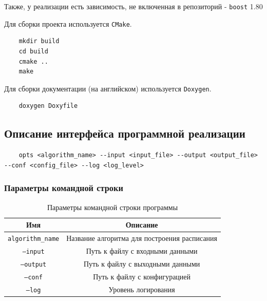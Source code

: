 Также, у реализации есть зависимость, не включенная в репозиторий - \texttt{boost} 1.80 \cite{boost_framework}

Для сборки проекта используется \texttt{CMake}.
\begin{verbatim}
    mkdir build
    cd build
    cmake ..
    make
\end{verbatim}

Для сборки документации (на английском) используется \texttt{Doxygen}.
\begin{verbatim}
    doxygen Doxyfile
\end{verbatim}

\subsection{Описание интерфейса программной реализации}
\begin{verbatim}
    opts <algorithm_name> --input <input_file> --output <output_file> --conf <config_file> --log <log_level>
\end{verbatim}
\subsubsection{Параметры командной строки}
\begin{table}[!ht]
    \begin{center}
        \begin{tabular}{|c|c|}
            \hline
            Имя                               & Описание                                     \\
            \hline
            \texttt{algorithm_name} & Название алгоритма для построения расписания \\
            \hline
            \texttt{--input}        & Путь к файлу с входными данными              \\
            \hline
            \texttt{--output}       & Путь к файлу с выходными данными             \\
            \hline
            \texttt{--conf}         & Путь к файлу с конфигурацией                 \\
            \hline
            \texttt{--log}          & Уровень логирования                          \\
            \hline
        \end{tabular}
        \caption{Параметры командной строки программы}
    \end{center}
\end{table}
